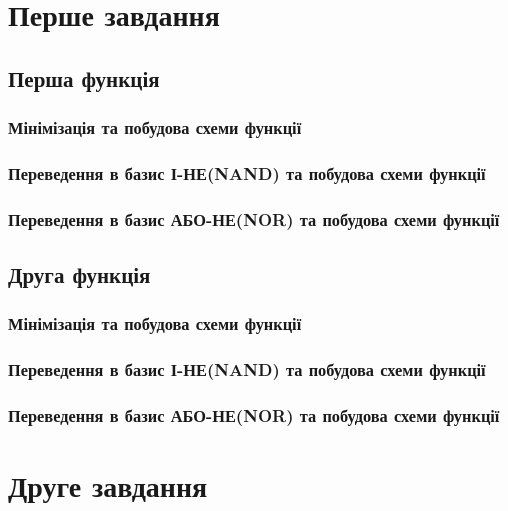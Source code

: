 \chapter{Перше завдання}
\section{Перша функція}
\newpage
\subsection{Мінімізація та побудова схеми функції}

\newpage
%
\subsection{Переведення в базис І-НЕ(NAND) та побудова схеми функції}
 
\newpage
%
\subsection{Переведення в базис АБО-НЕ(NOR) та побудова схеми функції}
 
\newpage
%
\section{Друга функція}

\newpage
\subsection{Мінімізація та побудова схеми функції}

\newpage
%
\subsection{Переведення в базис І-НЕ(NAND) та побудова схеми функції}

\newpage
%
\subsection{Переведення в базис АБО-НЕ(NOR) та побудова схеми функції}

\newpage
%
\chapter{Друге завдання}
